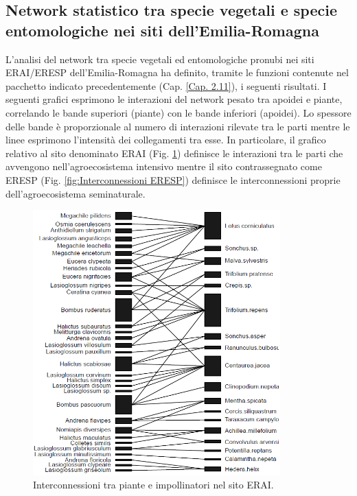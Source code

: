 \documentclass[main.tex]{subfiles}
\begin{document}
\subsection{Network statistico tra specie vegetali e specie entomologiche nei siti dell'Emilia-Romagna}

L’analisi del network tra specie vegetali ed entomologiche pronubi nei siti ERAI/ERESP dell’Emilia-Romagna ha definito, tramite le funzioni contenute nel pacchetto indicato precedentemente (Cap. \ref{Cap. 2.11}), i seguenti risultati.
I seguenti grafici esprimono le interazioni del network pesato tra apoidei e piante, correlando le bande superiori (piante) con le bande inferiori (apoidei). Lo spessore delle bande è proporzionale al numero di interazioni rilevate tra le parti mentre le linee esprimono l’intensità dei collegamenti tra esse. In particolare, il grafico relativo al sito denominato ERAI (Fig. \ref{fig:Interconnessioni ERAI}) definisce le interazioni tra le parti che avvengono nell’agroecosistema intensivo mentre il sito contrassegnato come ERESP (Fig. \ref{fig:Interconnessioni ERESP}) definisce le interconnessioni proprie dell’agroecosistema seminaturale.

\begin{figure}[H]
\centering
\includegraphics[width=0.85\textwidth]{./Immagini/Plotweb_Network_Api_Piante_AI.png}
\caption{Interconnessioni tra piante e impollinatori nel sito ERAI.}
\label{fig:Interconnessioni ERAI}
\end{figure}
\end{document}
